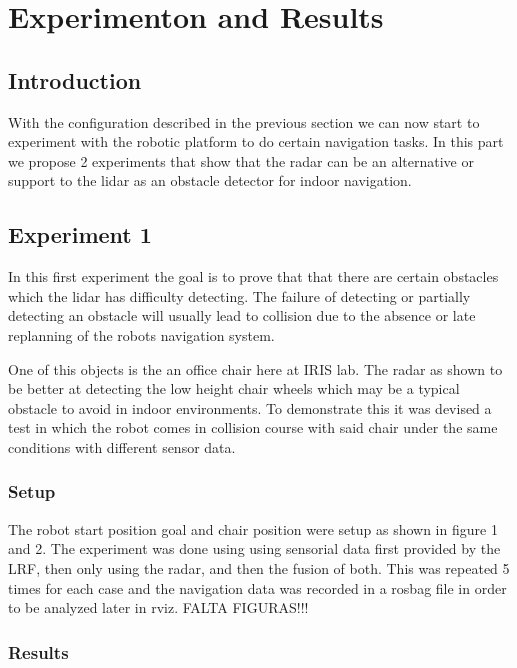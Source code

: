 \chapter{Experimenton and Results}

\section{Introduction}
With the configuration described in the previous section we can now start to experiment with the robotic platform to do certain navigation tasks. In this part we propose 2 experiments that show that the radar can be an alternative or support to the lidar as an obstacle detector for indoor navigation.

\section {Experiment 1}
In this first experiment the goal is to prove that that there are certain obstacles which the lidar has difficulty detecting. The failure of detecting or partially detecting an obstacle will usually lead to collision due to the absence or late replanning of the robots navigation system.

One of this objects is the an office chair here at IRIS lab. The radar as shown to  be better at detecting the low height chair wheels which may be a typical obstacle to avoid in indoor environments. To demonstrate this it was devised a test in which the robot comes in collision course with said chair under the same conditions with different sensor data. 
\subsection{Setup}
The robot start position goal and chair position were setup as shown in figure 1 and 2. The experiment was done using using sensorial data first provided by the \ac{LRF}, then only using the radar, and then the fusion of both. This was repeated 5 times for each case and the navigation data was recorded in a rosbag file in order to be analyzed later in rviz.
FALTA FIGURAS!!!
\subsection{Results}
